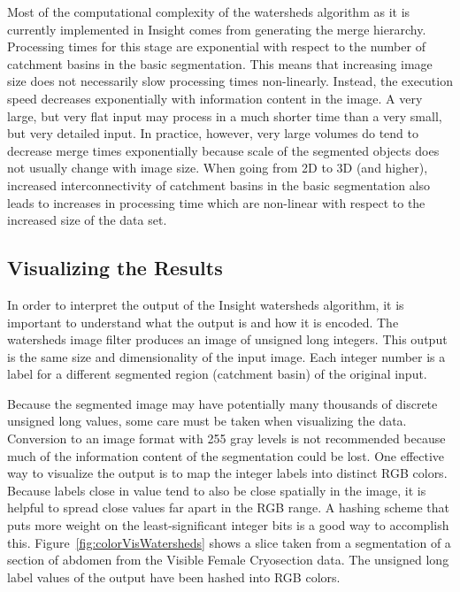 Most of the computational complexity of the watersheds algorithm as it is
currently implemented in Insight comes from generating the merge hierarchy.
Processing times for this stage are exponential with respect to the number of
catchment basins in the basic segmentation. This means that increasing image
size does not necessarily slow processing times non-linearly.  Instead, the
execution speed decreases exponentially with information content in the image.
A very large, but very flat input may process in a much shorter time than a
very small, but very detailed input.  In practice, however, very large volumes
do tend to decrease merge times exponentially because scale of the segmented
objects does not usually change with image size.  When going from 2D to 3D (and
higher), increased interconnectivity of catchment basins in the basic
segmentation also leads to increases in processing time which are non-linear
with respect to the increased size of the data set.

\subsection{Visualizing the Results}
\label{sec:VisualizingWatersheds}
In order to interpret the output of the Insight watersheds algorithm, it is
important to understand what the output is and how it is encoded.  The
watersheds image filter produces an image of unsigned long integers.  This
output is the same size and dimensionality of the input image.  Each integer
number is a label for a different segmented region (catchment basin) of the
original input.  

Because the segmented image may have potentially many thousands of discrete
unsigned long values, some care must be taken when visualizing the
data. Conversion to an image format with 255 gray levels is not recommended
because much of the information content of the segmentation could be lost.  One
effective way to visualize the output is to map the integer labels into
distinct RGB colors.  Because labels close in value tend to also be close
spatially in the image, it is helpful to spread close values far apart in
the RGB range.  A hashing scheme that puts more weight on the least-significant
integer bits is a good way to accomplish this.  Figure~\ref{fig:colorVisWatersheds} 
shows a slice taken from a segmentation of a section of abdomen from the Visible Female
Cryosection data.  The unsigned long label values of the output have been
hashed into RGB colors.

